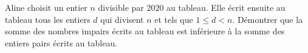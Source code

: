 Aline choisit un entier $n$ divisible par $2020$ au tableau. Elle écrit ensuite au tableau tous les entiers $d$ qui divisent $n$ et tels que $1\le d < n$. Démontrer que la somme des nombres impairs écrits au tableau est inférieure à la somme des entiers pairs écrits au tableau.